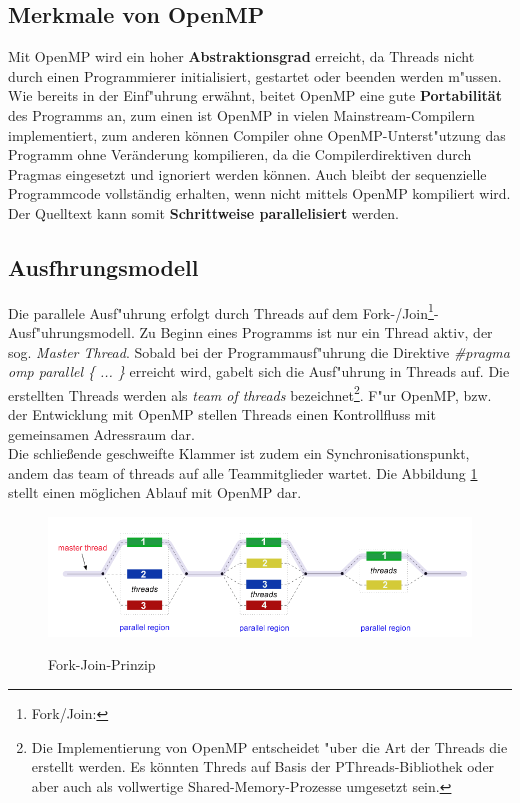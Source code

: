\documentclass[a4paper,11pt]{scrartcl}
\begin{document}
\subsection{Merkmale von OpenMP}

Mit OpenMP wird ein hoher \textbf{Abstraktionsgrad} erreicht, da Threads nicht durch einen
Programmierer initialisiert, gestartet oder beenden werden m"ussen. Wie bereits in der
Einf"uhrung erwähnt, beitet OpenMP eine gute \textbf{Portabilität} des Programms an, zum
einen ist OpenMP in vielen Mainstream-Compilern implementiert, zum anderen können Compiler
ohne OpenMP-Unterst"utzung das Programm ohne Veränderung kompilieren, da die
Compilerdirektiven durch Pragmas eingesetzt und ignoriert werden können. Auch bleibt der
sequenzielle Programmcode vollständig erhalten, wenn nicht mittels OpenMP kompiliert wird.
Der Quelltext kann somit \textbf{Schrittweise parallelisiert} werden. \\

\subsection{Ausfhrungsmodell} Die parallele Ausf"uhrung erfolgt durch Threads auf dem
Fork-/Join\footnote{Fork/Join:}-Ausf"uhrungsmodell. Zu Beginn eines Programms ist nur ein
Thread aktiv, der sog. \textit{Master Thread}. Sobald bei der Programmausf"uhrung die
Direktive \textit{\#pragma omp parallel \{ ... \} } erreicht wird, gabelt sich die
Ausf"uhrung in Threads auf. Die erstellten Threads werden als \textit{team of threads}
bezeichnet\footnote{Die Implementierung von OpenMP entscheidet "uber die Art der Threads
die erstellt werden. Es könnten Threds auf Basis der PThreads-Bibliothek oder aber auch
als vollwertige Shared-Memory-Prozesse umgesetzt sein.}. F"ur OpenMP, bzw. der Entwicklung
mit OpenMP stellen Threads einen Kontrollfluss mit gemeinsamen Adressraum dar.  \\ Die
schließende geschweifte Klammer ist zudem ein Synchronisationspunkt, andem das team of
threads auf alle Teammitglieder wartet. Die Abbildung \ref{Join-Fork-Modell} stellt einen
möglichen Ablauf mit OpenMP dar.

\begin{figure}[h!]
\centering
\includegraphics[width=1.0\textwidth]{img/fork_join.png}
\label{Join-Fork-Modell}
\caption{Fork-Join-Prinzip}
\end{figure}
\end{document}
